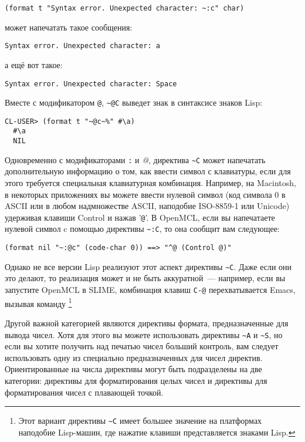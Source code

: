 \begin{lstlisting}
(format t "Syntax error. Unexpected character: ~:c" char)
\end{lstlisting}

\noindent{}может напечатать такое сообщения:

\begin{lstlisting}[style=lisprepl]
  Syntax error. Unexpected character: a
\end{lstlisting}

\noindent{}а ещё вот такое:

\begin{lstlisting}[style=lisprepl]
  Syntax error. Unexpected character: Space
\end{lstlisting}

Вместе с модификатором \lstinline!@!, \lstinline!~@С! выведет знак в синтаксисе знаков
Lisp:

\begin{lstlisting}[style=lisprepl]
  CL-USER> (format t "~@c~%" #\a)
  #\a
  NIL
\end{lstlisting}

Одновременно с модификаторами \lstinline!:! и \textit{@}, директива \lstinline!~C! может
напечатать дополнительную информацию о том, как ввести символ с клавиатуры, если для этого
требуется специальная клавиатурная комбинация. Например, на Macintosh, в некоторых
приложениях вы можете ввести нулевой символ (код символа 0 в ASCII или в любом
надмножестве ASCII, наподобие ISO-8859-1 или Unicode) удерживая клавиши Control и нажав
'\lstinline!@!'. В OpenMCL, если вы напечатаете нулевой символ c помощью директивы
\lstinline!~:C!, то она сообщит вам следующее:
  
\begin{lstlisting}[style=lisprepl]
  (format nil "~:@c" (code-char 0)) ==> "^@ (Control @)"
\end{lstlisting}

Однако не все версии Lisp реализуют этот аспект директивы \lstinline!~C!. Даже если они
это делают, то реализация может и не быть аккуратной~--- например, если вы запустите OpenMCL
в SLIME, комбинация клавиш \lstinline!C-@! перехватывается Emacs, вызывая команду
\footnote{Этот вариант директивы \lstinline!~C! имеет большее
  значение на платформах наподобие Lisp-машин, где нажатие клавиши представляется знаками
  Lisp.}
	
Другой важной категорией являются директивы формата, предназначенные для вывода
чисел. Хотя для этого вы можете использовать директивы \lstinline!~A! и \lstinline!~S!, но
если вы хотите получить над печатью чисел больший контроль, вам следует использовать одну
из специально предназначенных для чисел директив. Ориентированные на числа директивы могут
быть подразделены на две категории: директивы для форматирования целых чисел и директивы
для форматирования чисел с плавающей точкой.

